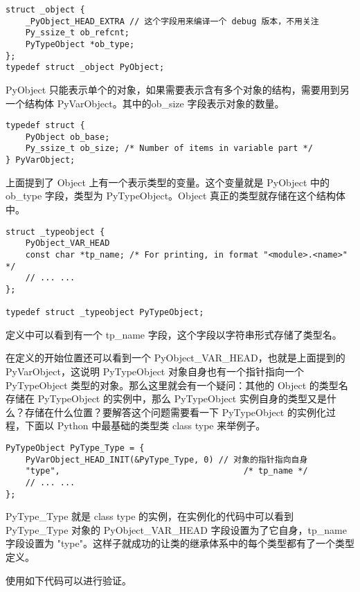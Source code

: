 \documentclass[12pt]{article}
\begin{document}
\begin{lstlisting}[caption={PyObject定义}]
struct _object {
    _PyObject_HEAD_EXTRA // 这个字段用来编译一个 debug 版本，不用关注
    Py_ssize_t ob_refcnt;
    PyTypeObject *ob_type;
};
typedef struct _object PyObject;
\end{lstlisting}

PyObject 只能表示单个的对象，如果需要表示含有多个对象的结构，需要用到另一个结构体 PyVarObject。其中的ob\_size 字段表示对象的数量。

\begin{lstlisting}[caption={PyVarObject 定义}]
typedef struct {
    PyObject ob_base;
    Py_ssize_t ob_size; /* Number of items in variable part */
} PyVarObject;
\end{lstlisting}


上面提到了 Object 上有一个表示类型的变量。这个变量就是 PyObject 中的 ob\_type 字段，类型为 PyTypeObject。Object 真正的类型就存储在这个结构体中。

\begin{lstlisting}[caption={PyTypeObject 的定义}]
struct _typeobject {
    PyObject_VAR_HEAD
    const char *tp_name; /* For printing, in format "<module>.<name>" */
    // ... ...
};

typedef struct _typeobject PyTypeObject;
\end{lstlisting}

定义中可以看到有一个 tp\_name 字段，这个字段以字符串形式存储了类型名。

在定义的开始位置还可以看到一个 PyObject\_VAR\_HEAD，也就是上面提到的 PyVarObject，这说明 PyTypeObject 对象自身也有一个指针指向一个 PyTypeObject 类型的对象。那么这里就会有一个疑问：其他的 Object 的类型名存储在 PyTypeObject 的实例中，那么 PyTypeObject 实例自身的类型又是什么？存储在什么位置？要解答这个问题需要看一下 PyTypeObject 的实例化过程，下面以 Python 中最基础的类型类 class type 来举例子。 


\begin{lstlisting}[caption={PyTypeObject 实例化}]
PyTypeObject PyType_Type = {
    PyVarObject_HEAD_INIT(&PyType_Type, 0) // 对象的指针指向自身
    "type",                                     /* tp_name */
    // ... ...
};
\end{lstlisting}

PyType\_Type 就是 class type 的实例，在实例化的代码中可以看到 PyType\_Type 对象的 PyObject\_VAR\_HEAD 字段设置为了它自身，tp\_name 字段设置为 "type"。这样子就成功的让类的继承体系中的每个类型都有了一个类型定义。

使用如下代码可以进行验证。
\end{document}
